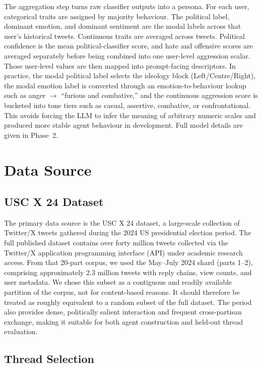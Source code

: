 \documentclass[logo,bsc,singlespacing,parskip,online]{infthesis}
\begin{document}
The aggregation step turns raw classifier outputs into a persona. For each user, categorical traits are assigned by majority behaviour. The political label, dominant emotion, and dominant sentiment are the modal labels across that user's historical tweets. Continuous traits are averaged across tweets. Political confidence is the mean political-classifier score, and hate and offensive scores are averaged separately before being combined into one user-level aggression scalar. Those user-level values are then mapped into prompt-facing descriptors. In practice, the modal political label selects the ideology block (Left/Centre/Right), the modal emotion label is converted through an emotion-to-behaviour lookup such as anger $\rightarrow$ ``furious and combative,'' and the continuous aggression score is bucketed into tone tiers such as casual, assertive, combative, or confrontational. This avoids forcing the LLM to infer the meaning of arbitrary numeric scales and produced more stable agent behaviour in development. Full model details are given in Phase~2.

\section{Data Source}

\subsection{USC X 24 Dataset}

The primary data source is the USC X 24 dataset, a large-scale collection of Twitter/X tweets gathered during the 2024 US presidential election period. The full published dataset contains over forty million tweets collected via the Twitter/X application programming interface (API) under academic research access. From that 20-part corpus, we used the May--July 2024 shard (parts 1--2), comprising approximately 2.3 million tweets with reply chains, view counts, and user metadata. We chose this subset as a contiguous and readily available partition of the corpus, not for content-based reasons. It should therefore be treated as roughly equivalent to a random subset of the full dataset. The period also provides dense, politically salient interaction and frequent cross-partisan exchange, making it suitable for both agent construction and held-out thread evaluation.

\subsection{Thread Selection}
\end{document}
